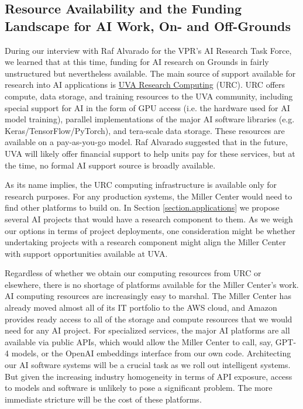 \documentclass[12pt, oneside]{article}   	%
\begin{document}
\subsection{Resource Availability and the Funding Landscape for AI Work, On- and Off-Grounds}\label{section.grounds.funding}
During our interview with Raf Alvarado for the VPR's AI Research Task Force, we learned that at this time, funding for AI research on Grounds in fairly unstructured but nevertheless available.  The main source of support available for research into AI applications is \href{https://www.rc.virginia.edu}{UVA Research Computing} (URC).  URC offers compute, data storage, and training resources to the UVA community, including special support for AI in the form of GPU access (i.e. the hardware used for AI model training), parallel implementations of the major AI software libraries (e.g. Keras/TensorFlow/PyTorch), and tera-scale data storage.  These resources are available on a pay-as-you-go model.  Raf Alvarado suggested that in the future, UVA will likely offer financial support to help units pay for these services, but at the time, no formal AI support source is broadly available.

As its name implies, the URC computing infrastructure is available only for research purposes.  For any production systems, the Miller Center would need to find other platforms to build on.  In Section \ref{section.applications} we propose several AI projects that would have a research component to them.  As we weigh our options in terms of project deployments, one consideration might be whether undertaking projects with a research component might align the Miller Center with support opportunities available at UVA.

Regardless of whether we obtain our computing resources from URC or elsewhere, there is no shortage of platforms available for the Miller Center's work.   AI computing resources are increasingly easy to marshal.  The Miller Center has already moved almost all of its IT portfolio to the AWS cloud, and Amazon provides ready access to all of the storage and compute resources that we would need for any AI project.  For specialized services, the major AI platforms are all available via public APIs, which would allow the Miller Center to call, say, GPT-4 models, or the OpenAI embeddings interface from our own code.  Architecting our AI software systems will be a crucial task as we roll out intelligent systems.  But given the increasing industry homogeneity in terms of API exposure, access to models and software is unlikely to pose a significant problem.  The more immediate stricture will be the cost of these platforms.
\end{document}
